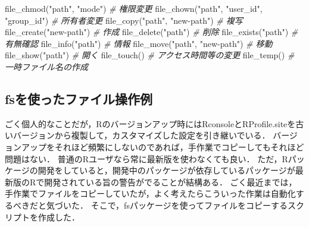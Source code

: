 \documentclass[
]{article}
\newenvironment{Shaded}{\begin{snugshade}}{\end{snugshade}}
\newcommand{\CommentTok}[1]{\textcolor[rgb]{0.56,0.35,0.01}{\textit{#1}}}
\newcommand{\FunctionTok}[1]{\textcolor[rgb]{0.00,0.00,0.00}{#1}}
\newcommand{\NormalTok}[1]{#1}
\newcommand{\StringTok}[1]{\textcolor[rgb]{0.31,0.60,0.02}{#1}}
\begin{document}
\begin{Shaded}
\begin{Highlighting}[]
\FunctionTok{file\_chmod}\NormalTok{(}\StringTok{"path"}\NormalTok{, }\StringTok{"mode"}\NormalTok{) }\CommentTok{\# 権限変更   }
\FunctionTok{file\_chown}\NormalTok{(}\StringTok{"path"}\NormalTok{, }\StringTok{"user\_id"}\NormalTok{, }\StringTok{"group\_id"}\NormalTok{) }\CommentTok{\# 所有者変更   }
\FunctionTok{file\_copy}\NormalTok{(}\StringTok{"path"}\NormalTok{, }\StringTok{"new{-}path"}\NormalTok{) }\CommentTok{\# 複写   }
\FunctionTok{file\_create}\NormalTok{(}\StringTok{"new{-}path"}\NormalTok{) }\CommentTok{\# 作成   }
\FunctionTok{file\_delete}\NormalTok{(}\StringTok{"path"}\NormalTok{) }\CommentTok{\# 削除   }
\FunctionTok{file\_exists}\NormalTok{(}\StringTok{"path"}\NormalTok{) }\CommentTok{\# 有無確認   }
\FunctionTok{file\_info}\NormalTok{(}\StringTok{"path"}\NormalTok{) }\CommentTok{\# 情報   }
\FunctionTok{file\_move}\NormalTok{(}\StringTok{"path"}\NormalTok{, }\StringTok{"new{-}path"}\NormalTok{) }\CommentTok{\# 移動   }
\FunctionTok{file\_show}\NormalTok{(}\StringTok{"path"}\NormalTok{) }\CommentTok{\# 開く   }
\FunctionTok{file\_touch}\NormalTok{() }\CommentTok{\# アクセス時間等の変更   }
\FunctionTok{file\_temp}\NormalTok{() }\CommentTok{\# 一時ファイル名の作成   }
\end{Highlighting}
\end{Shaded}

\hypertarget{fsux3092ux4f7fux3063ux305fux30d5ux30a1ux30a4ux30ebux64cdux4f5cux4f8b}{%
\subsection{fsを使ったファイル操作例}\label{fsux3092ux4f7fux3063ux305fux30d5ux30a1ux30a4ux30ebux64cdux4f5cux4f8b}}

ごく個人的なことだが，Rのバージョンアップ時にはRconsoleとRProfile.siteを古いバージョンから複製して，カスタマイズした設定を引き継いでいる．
バージョンアップをそれほど頻繁にしないのであれば，手作業でコピーしてもそれほど問題はない．
普通のRユーザなら常に最新版を使わなくても良い．
ただ，Rパッケージの開発をしていると，開発中のパッケージが依存しているパッケージが最新版のRで開発されている旨の警告がでることが結構ある．
ごく最近までは，手作業でファイルをコピーしていたが，よく考えたらこういった作業は自動化するべきだと気づいた．
そこで，fsパッケージを使ってファイルをコピーするスクリプトを作成した．
\end{document}
